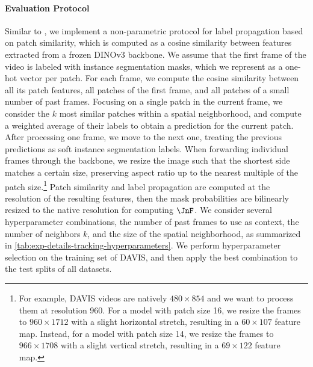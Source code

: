 \paragraph{Evaluation Protocol}
Similar to \citet{rajasegaran2025empirical}, we implement a non-parametric protocol for label propagation based on patch similarity, which is computed as a cosine similarity between features extracted from a frozen DINOv3 backbone.
We assume that the first frame of the video is labeled with instance segmentation masks, which we represent as a one-hot vector per patch.
For each frame, we compute the cosine similarity between all its patch features, all patches of the first frame, and all patches of a small number of past frames.
Focusing on a single patch in the current frame, we consider the \(k\) most similar patches within a spatial neighborhood, and compute a weighted average of their labels to obtain a prediction for the current patch.
After processing one frame, we move to the next one, treating the previous predictions as soft instance segmentation labels.
When forwarding individual frames through the backbone, we resize the image such that the shortest side matches a certain size, preserving aspect ratio up to the nearest multiple of the patch size.\footnote{
For example, DAVIS videos are natively \(480{\times}854\) and we want to process them at resolution 960.
For a model with patch size 16, we resize the frames to \(960{\times}1712\) with a slight horizontal stretch, resulting in a \(60{\times}107\) feature map.
Instead, for a model with patch size 14, we resize the frames to \(966{\times}1708\) with a slight vertical stretch, resulting in a \(69{\times}122\) feature map.
}
Patch similarity and label propagation are computed at the resolution of the resulting features, then the mask probabilities are bilinearly resized to the native resolution for computing \(\JnF\).
We consider several hyperparameter combinations, \eg the number of past frames to use as context, the number of neighbors \(k\), and the size of the spatial neighborhood, as summarized in \cref{tab:exp-details-tracking-hyperparameters}.
We perform hyperparameter selection on the training set of DAVIS, and then apply the best combination to the test splits of all datasets.

